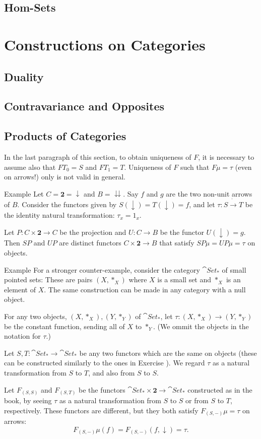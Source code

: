 \section{Hom-Sets}

\chapter{Constructions on Categories}

\section{Duality}

\section{Contravariance and Opposites}

\section{Products of Categories}
In the last paragraph of this section, to obtain uniqueness of $F$, it is necessary to assume also that $FT_0=S$ and $FT_1=T$. Uniqueness of $F$ such that $F\mu=\tau$ (even on arrows!) only is not valid in general.

\begin{denv*}{Example}
	Let $C=\mathbf{2}=\downarrow$ and $B=\downdownarrows$. Say $f$ and $g$ are the two non-unit arrows of $B$. Consider the functors given by $S(\downarrow)=T(\downarrow)=f$, and let $\tau:S\dot{\to}T$ be the identity natural transformation: $\tau_x=1_x$.

	Let $P:C\times\mathbf{2}\to C$ be the projection and $U:C\to B$ be the functor $U(\downarrow)=g$. Then $SP$ and $UP$ are distinct functors $C\times\mathbf{2}\to B$ that satisfy $SP\mu=UP\mu=\tau$ on objects.
\end{denv*}

\begin{denv*}{Example}
	For a stronger counter-example, consider the category $\cat{Set}_*$ of small pointed sets: These are pairs $(X,\ast_X)$ where $X$ is a small set and $\ast_X$ is an element of $X$. The same construction can be made in any category with a null object.
	
	For any two objects, $(X,\ast_X),(Y,\ast_Y)$ of $\cat{Set}_\ast$, let $\tau\colon (X,\ast_X)\to(Y,\ast_Y)$ be the constant function, sending all of $X$ to $\ast_Y$. (We ommit the objects in the notation for $\tau$.)
	
	Let $S,T\colon\cat{Set}_\ast\to\cat{Set}_\ast$ be any two functors which are the same on objects (these can be constructed similarly to the ones in Exercise ).	We regard $\tau$ as a natural transformation from $S$ to $T$, and also from $S$ to $S$.
	
	Let $F_{(S,S)}$ and $F_{(S,T)}$ be the functors $\cat{Set}_\ast\times\mathbf{2}\to\cat{Set}_\ast$ constructed as in the book, by seeing $\tau$ as a natural transformation from $S$ to $S$ or from $S$ to $T$, respectively. These functors are different, but they both satisfy $F_{(S,-)}\mu=\tau$ on arrows:
	\[F_{(S,-)}\mu(f)=F_{(S,-)}(f,\downarrow)=\tau.\]
\end{denv*}

